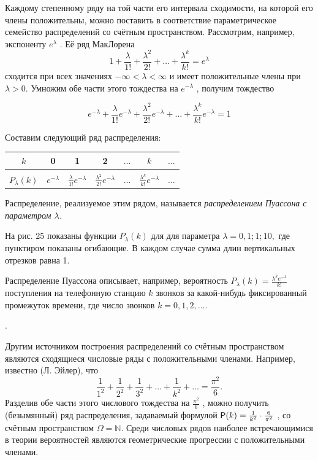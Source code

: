 \begin{zam}
	\label{zam:4.14}
Каждому степенному ряду на той части его интервала
сходимости, на которой его члены положительны, можно поставить в соответствие параметрическое семейство распределений со счётным пространством.
Рассмотрим, например, экспоненту $e^\lambda$ . Её ряд МакЛорена
$$1+ \frac{\lambda}{1!} + \frac{\lambda^2}{2!} + \ldots + \frac{\lambda^k}{k!} = e^\lambda$$
сходится при всех значениях $−\infty < \lambda < \infty$ и имеет положительные члены при $\lambda > 0$. Умножим обе части этого тождества на $e^{−\lambda}$ , получим тождество

$$e^{−\lambda}+ \frac{\lambda}{1!} e^{−\lambda} + \frac{\lambda^2}{2!} e^{−\lambda}+ \ldots + \frac{\lambda^k}{k!} e^{−\lambda}= 1$$

Составим следующий ряд распределения:

\begin{center}
	\begin{tabular}{|c|c|c|c|c|c|c|}
		\hline
		$k$ 			& 0 								& 1 				  & 2 & $\ldots$ & $k$ 		& $\ldots$ \\ \hline
		&&&&&& \\[-1em] 
		$P_\lambda(k)$  & $e^{-\lambda}$ & $\frac{\lambda}{1!}e^{-\lambda}$ & $\frac{\lambda^2}{2!}e^{-\lambda}$ & $\ldots$ & $\frac{\lambda^k}{k!}e^{-\lambda}$& $\ldots$ \\[1ex] \hline
	\end{tabular}
\end{center}
\end{zam}

\begin{definition}
	\label{def:4.15}
Распределение, реализуемое этим рядом, называется \textit{распределением Пуассона с параметром $\lambda$.}

На рис. 25 показаны функции $P_\lambda (k)$ для для параметра $\lambda = 0, 1; 1; 10,$ где
пунктиром показаны огибающие. В каждом случае сумма длин вертикальных отрезков равна 1.

Распределение Пуассона описывает, например, вероятность $P_\lambda (k) = \frac{\lambda^k e^{-\lambda}}{k!}$
поступления на телефонную станцию $k$ звонков за какой-нибудь фиксированный промежуток времени, где число звонков $k = 0, 1, 2, \ldots$.
\end{definition}. 
\begin{zam}
	\label{zam:4.16}
Другим источником построения распределений со счётным пространством являются сходящиеся числовые ряды с положительными членами. Например, известно (Л. Эйлер), что
$$\frac{1}{1^2} + \frac{1}{2^2} + \frac{1}{3^2} + \ldots + \frac{1}{k^2} + \ldots = \frac{\pi^2}{6}.$$
Разделив обе части этого числового тождества на $\frac{\pi^2}{6}$ , можно получить (безымянный) ряд распределения, задаваемый формулой $\P(k) = \frac{1}{k^2} \cdot \frac{6}{\pi^2}$ , со счётным пространством $\Omega = \mathbb{N}$.
Среди числовых рядов наиболее встречающимися в теории вероятностей являются геометрические прогрессии с положительными членами.
\end{zam}

